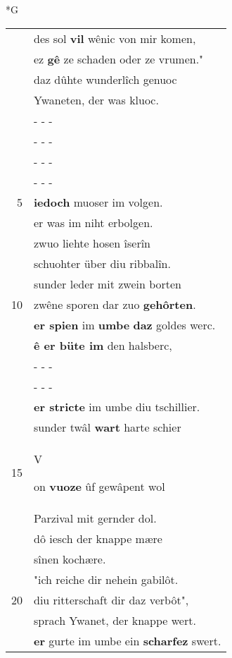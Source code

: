 \documentclass[8pt,a4paper,notitlepage]{article}
\begin{document}
\newpage
\begin{table}[ht]
\begin{minipage}[t]{0.5\linewidth}
\small
\begin{center}*G
\end{center}
\begin{tabular}{rl}
 & des sol \textbf{vil} wênic von mir komen,\\ 
 & ez \textbf{gê} ze schaden oder ze vrumen."\\ 
 & daz dûhte wunderlîch genuoc\\ 
 & Ywaneten, der was kluoc.\\ 
 & \multicolumn{1}{l}{ - - - }\\ 
 & \multicolumn{1}{l}{ - - - }\\ 
 & \multicolumn{1}{l}{ - - - }\\ 
 & \multicolumn{1}{l}{ - - - }\\ 
5 & \textbf{iedoch} muoser im volgen.\\ 
 & er was im niht erbolgen.\\ 
 & zwuo liehte hosen îserîn\\ 
 & schuohter über diu ribbalîn.\\ 
 & sunder leder mit zwein borten\\ 
10 & zwêne sporen dar zuo \textbf{gehôrten}.\\ 
 & \textbf{er spien} im \textbf{umbe} \textbf{daz} goldes werc.\\ 
 & \textbf{ê er büte im} den halsberc,\\ 
 & \multicolumn{1}{l}{ - - - }\\ 
 & \multicolumn{1}{l}{ - - - }\\ 
 & \textbf{er stricte} im umbe diu tschillier.\\ 
 & sunder twâl \textbf{wart} harte schier\\ 
15 & \begin{large}V\end{large}on \textbf{vuoze} ûf gewâpent wol\\ 
 & Parzival mit gernder dol.\\ 
 & dô iesch der knappe mære\\ 
 & sînen kochære.\\ 
 & "ich reiche dir nehein gabilôt.\\ 
20 & diu ritterschaft dir daz verbôt",\\ 
 & sprach Ywanet, der knappe wert.\\ 
 & \textbf{er} gurte im umbe ein \textbf{scharfez} swert.\\ 

\end{tabular}
\end{minipage}
\end{table}
\end{document}
